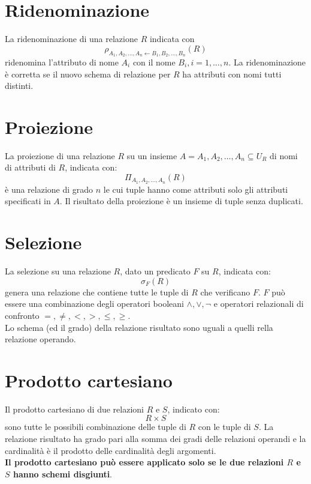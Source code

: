\documentclass[12pt, a4paper]{report}
\begin{document}
    \section{Ridenominazione}
    La ridenominazione di una relazione $R$ indicata con
    \begin{equation*}
        \rho_{A_{1},A_{2},\ldots,A_{n} \leftarrow B_{1},B_{2},\ldots,B_{n}}(R)
    \end{equation*}
    ridenomina l'attributo di nome $A_{i}$ con il nome $B_{i}, i=1,\ldots,n$. La ridenominazione è corretta se il nuovo schema di relazione per $R$ ha attributi con nomi tutti distinti. 
    \section{Proiezione}
    La proiezione di una relazione $R$ su un insieme $A={A_{1},A_{2},\ldots,A_{n}}\subseteq U_{R}$ di nomi di attributi di $R$, indicata con:
    \begin{equation*}
        \Pi_{A_{1},A_{2},\ldots,A_{n}}(R)
    \end{equation*}
    è una relazione di grado $n$ le cui tuple hanno come attributi solo gli attributi specificati in $A$. Il risultato della proiezione è un insieme di tuple senza duplicati.
    \section{Selezione}
    La selezione su una relazione $R$, dato un predicato $F$ su $R$, indicata con:
    \begin{equation*}
        \sigma_{F}(R)
    \end{equation*}
    genera una relazione che contiene tutte le tuple di $R$ che verificano $F$. $F$ può essere una combinazione degli operatori booleani $\land,\lor, \lnot$ e operatori relazionali di confronto $=,\neq,<,>,\leq,\geq$.\\
    Lo schema (ed il grado) della relazione risultato sono uguali a quelli rella relazione operando.
    \section{Prodotto cartesiano}
    Il prodotto cartesiano di due relazioni $R$ e $S$, indicato con:
    \begin{equation*}
        R \times S
    \end{equation*}
    sono tutte le possibili combinazione delle tuple di $R$ con le tuple di $S$. La relazione risultato ha grado pari alla somma dei gradi delle relazioni operandi e la cardinalità è il prodotto delle cardinalità degli argomenti.\\
    \textbf{Il prodotto cartesiano può essere applicato solo se le due relazioni $R$ e $S$ hanno schemi disgiunti}.
\end{document}

